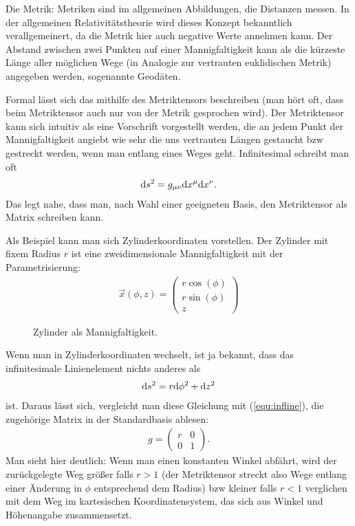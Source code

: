 \documentclass{scrartcl}
\begin{document}
		\begin{paragraph}{Die Metrik:} Metriken sind im allgemeinen Abbildungen, die Distanzen messen. In der allgemeinen
			Relativitätstheorie wird dieses Konzept bekanntlich verallgemeinert, da die Metrik hier auch negative
			Werte annehmen kann. Der Abstand zwischen zwei Punkten auf einer Mannigfaltigkeit kann als die kürzeste Länge 
			aller möglichen Wege (in Analogie zur vertrauten euklidischen Metrik) angegeben werden, sogenannte Geodäten.
			
			Formal lässt sich das mithilfe des Metriktensors beschreiben (man hört oft, dass beim Metriktensor auch nur von
			der Metrik gesprochen wird). Der Metriktensor kann sich intuitiv als eine Vorschrift vorgestellt werden, die an jedem
			Punkt der Mannigfaltigkeit angiebt wie sehr die uns vertrauten Längen gestaucht bzw gestreckt werden, wenn 
			man entlang eines Weges geht. Infinitesimal schreibt man oft
			\begin{align}
				{\rm d}s^2=g_{\mu\nu} {\rm d}x^\mu{\rm d}x^\nu.
				\label{equ:infline}
			\end{align}
			Das legt nahe, dass man, nach Wahl einer geeigneten Basis, den Metriktensor als Matrix schreiben kann.
			
			Als Beispiel kann man sich Zylinderkoordinaten vorstellen. Der Zylinder mit fixem Radius $r$ ist eine 
			zweidimensionale Mannigfaltigkeit mit der Parametrisierung:
			\begin{align}
				\vec{x}(\phi,z)=\left( 
				\begin{array}{c}
				r\cos(\phi)\\
				r\sin(\phi)\\
				z
				\end{array}
				\right)
			\end{align}
			\begin{figure}
				\centering
				
				\caption{Zylinder als Mannigfaltigkeit.}
			\end{figure}
			Wenn man in Zylinderkoordinaten wechselt, ist ja bekannt, dass das infinitesimale Linienelement nichts anderes als
			\begin{align*}
				{\rm d}s^2=r{\rm d}\phi^2 + {\rm d}z^2
			\end{align*}
			ist. Daraus lässt sich, vergleicht man diese Gleichung mit (\ref{equ:infline}), die zugehörige Matrix in der Standardbasis ablesen:
			\begin{align*}
				g=\left(\begin{array}{ccc} r & 0\\0 & 1 \end{array}\right).
			\end{align*}
			Man sieht hier deutlich: Wenn man einen konstanten Winkel abfährt, wird der zurückgelegte Weg größer falls $r>1$ (der Metriktensor streckt also
			Wege entlang einer Änderung in $\phi$ entsprechend dem Radius) bzw kleiner falls $r<1$ verglichen mit dem Weg im kartesischen Koordinatensystem,
			das sich aus Winkel und Höhenangabe zusammensetzt.
		\end{paragraph}
\end{document}
